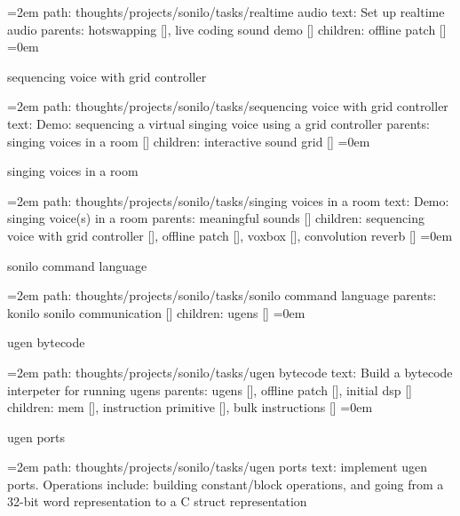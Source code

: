 \par\begingroup
\leftskip=2em
path: thoughts/projects/sonilo/tasks/realtime audio
\smallskip
text:  Set up realtime audio
\smallskip
parents:  hotswapping [], live coding sound demo []
\smallskip
children: offline patch []
\smallskip
\leftskip=0em
\par\endgroup
\bigskip
{}
sequencing voice with grid controller
\smallskip
\par\begingroup
\leftskip=2em
path: thoughts/projects/sonilo/tasks/sequencing voice with grid controller
\smallskip
text:  Demo: sequencing a virtual singing voice using a grid controller
\smallskip
parents:  singing voices in a room []
\smallskip
children: interactive sound grid []
\smallskip
\leftskip=0em
\par\endgroup
\bigskip
{}
singing voices in a room
\smallskip
\par\begingroup
\leftskip=2em
path: thoughts/projects/sonilo/tasks/singing voices in a room
\smallskip
text:  Demo: singing voice(s) in a room
\smallskip
parents:  meaningful sounds []
\smallskip
children: sequencing voice with grid controller [], offline patch [], voxbox [], convolution reverb []
\smallskip
\leftskip=0em
\par\endgroup
\bigskip
{}
sonilo command language
\smallskip
\par\begingroup
\leftskip=2em
path: thoughts/projects/sonilo/tasks/sonilo command language
\smallskip
parents:  konilo sonilo communication []
\smallskip
children: ugens []
\smallskip
\leftskip=0em
\par\endgroup
\bigskip
{}
ugen bytecode
\smallskip
\par\begingroup
\leftskip=2em
path: thoughts/projects/sonilo/tasks/ugen bytecode
\smallskip
text:  Build a bytecode interpeter for running ugens
\smallskip
parents:  ugens [], offline patch [], initial dsp []
\smallskip
children: mem [], instruction primitive [], bulk instructions []
\smallskip
\leftskip=0em
\par\endgroup
\bigskip
{}
ugen ports
\smallskip
\par\begingroup
\leftskip=2em
path: thoughts/projects/sonilo/tasks/ugen ports
\smallskip
text:  implement ugen ports. Operations include: building constant/block operations, and going from a 32-bit word representation to a C struct representation

